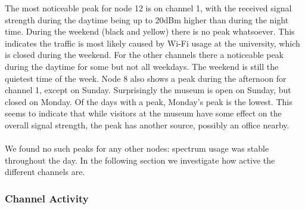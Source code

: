 \documentclass[a4paper, 11pt]{article}
\begin{document}
The most noticeable peak for node 12 is on channel 1, with the received signal strength during the daytime being up to 20dBm higher than during the night time. During the weekend (black and yellow) there is no peak whatsoever. This indicates the traffic is most likely caused by Wi-Fi usage at the university, which is closed during the weekend. For the other channels there a noticeable peak during the daytime for some but not all weekdays. The weekend is still the quietest time of the week. Node 8 also shows a peak during the afternoon for channel 1, except on Sunday. Surprisingly the museum is open on Sunday, but closed on Monday. Of the days with a peak, Monday's peak is the lowest. This seems to indicate that while visitors at the museum have some effect on the overall signal strength, the peak has another source, possibly an office nearby. \\ \\
We found no such peaks for any other nodes: spectrum usage was stable throughout the day. In the following section we investigate how active the different channels are.


\subsubsection{Channel Activity}
\end{document}
